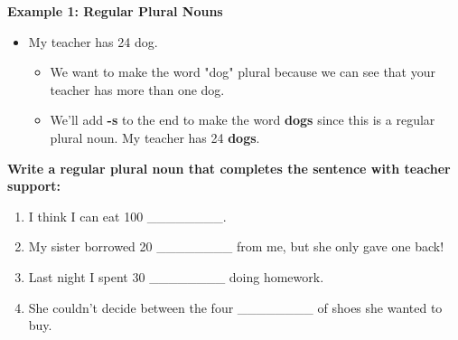 \documentclass[12pt]{article}
\begin{document}
\vspace{1em}

\begin{tcolorbox}[colframe=black!60, colback=white, 
coltitle=black, colbacktitle=black!15, fonttitle=\bfseries\Large, 
title=Examples, halign title=center, left=10pt, right=10pt, top=10pt, bottom=15pt]
\textbf{Example 1: Regular Plural Nouns}
\begin{itemize}
    \item My teacher has 24 dog.
    \begin{itemize}
        \item We want to make the word "dog" plural because we can see that your teacher has more than one dog.
    \end{itemize}
    \begin{itemize}
        \item We'll add \textbf{-s} to the end to make the word \textbf{dogs} since this is a regular plural noun. My teacher has 24 \textbf{dogs}.
    \end{itemize}
\end{itemize}



     \end{tcolorbox}

\vspace{1em}

\begin{tcolorbox}[colframe=black!60, colback=white, 
coltitle=black, colbacktitle=black!15, fonttitle=\bfseries\Large, 
title=Guided Practice, halign title=center, left=10pt, right=10pt, top=10pt, bottom=15pt]
\textbf{Write a regular plural noun that completes the sentence with teacher support:}
\begin{enumerate}[itemsep=3em] %
    \item I think I can eat 100 \_\_\_\_\_\_\_\_.
    \item     My sister borrowed 20 \_\_\_\_\_\_\_\_ from me, but she only gave one back!
    \item Last night I spent 30 \_\_\_\_\_\_\_\_  doing homework.
    \item She couldn't decide between the four \_\_\_\_\_\_\_\_ of shoes she wanted to buy.
\vspace{1.5em}\end{enumerate}
\end{tcolorbox}

\vspace{.5em}
\end{document}
